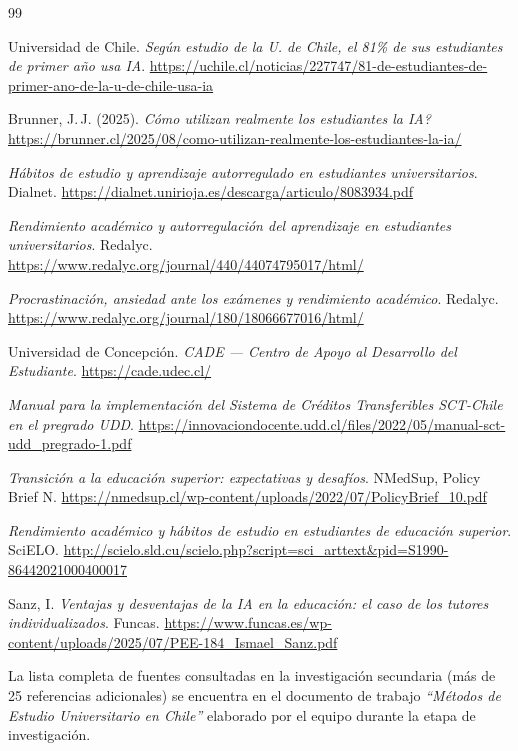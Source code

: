 \documentclass[11pt,a4paper]{article}
\begin{document}
\begin{thebibliography}{99}

 Universidad de Chile. \emph{Seg\'un estudio de la U. de Chile, el 81\% de sus estudiantes de primer a\~no usa IA}. \url{https://uchile.cl/noticias/227747/81-de-estudiantes-de-primer-ano-de-la-u-de-chile-usa-ia}

 Brunner, J.\,J. (2025). \emph{\textquestiondown C\'omo utilizan realmente los estudiantes la IA?} \url{https://brunner.cl/2025/08/como-utilizan-realmente-los-estudiantes-la-ia/}

 \emph{H\'abitos de estudio y aprendizaje autorregulado en estudiantes universitarios}. Dialnet. \url{https://dialnet.unirioja.es/descarga/articulo/8083934.pdf}

 \emph{Rendimiento acad\'emico y autorregulaci\'on del aprendizaje en estudiantes universitarios}. Redalyc. \url{https://www.redalyc.org/journal/440/44074795017/html/}

 \emph{Procrastinaci\'on, ansiedad ante los ex\'amenes y rendimiento acad\'emico}. Redalyc. \url{https://www.redalyc.org/journal/180/18066677016/html/}

 Universidad de Concepci\'on. \emph{CADE --- Centro de Apoyo al Desarrollo del Estudiante}. \url{https://cade.udec.cl/}

 \emph{Manual para la implementaci\'on del Sistema de Cr\'editos Transferibles SCT-Chile en el pregrado UDD}. \url{https://innovaciondocente.udd.cl/files/2022/05/manual-sct-udd_pregrado-1.pdf}

 \emph{Transici\'on a la educaci\'on superior: expectativas y desaf\'ios}. NMedSup, Policy Brief N. \url{https://nmedsup.cl/wp-content/uploads/2022/07/PolicyBrief_10.pdf}

 \emph{Rendimiento acad\'emico y h\'abitos de estudio en estudiantes de educaci\'on superior}. SciELO. \url{http://scielo.sld.cu/scielo.php?script=sci_arttext&pid=S1990-86442021000400017}

 Sanz, I. \emph{Ventajas y desventajas de la IA en la educaci\'on: el caso de los tutores individualizados}. Funcas. \url{https://www.funcas.es/wp-content/uploads/2025/07/PEE-184_Ismael_Sanz.pdf}

\end{thebibliography}

\vspace{1cm}
\noindent\small La lista completa de fuentes consultadas en la investigaci\'on secundaria (m\'as de 25 referencias adicionales) se encuentra en el documento de trabajo \emph{``M\'etodos de Estudio Universitario en Chile''} elaborado por el equipo durante la etapa de investigaci\'on.
\end{document}
